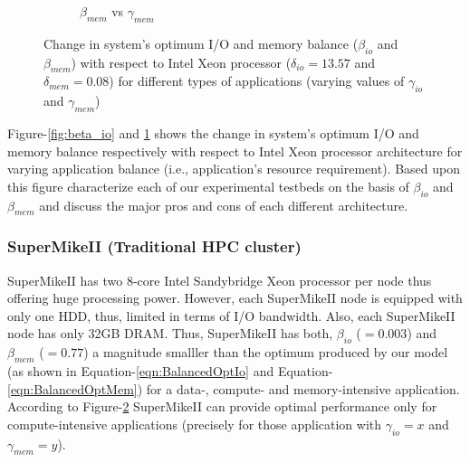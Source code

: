 \documentclass[journal]{IEEEtran}
\begin{document}
\begin{figure}[htb]
\begin{subfigure}[b]{0.23\textwidth}
                \caption{$\beta_{mem}$ vs  $\gamma_{mem}$}
                \label{fig:beta_mem}
   \end{subfigure}
   \caption{Change in system's optimum I/O and memory balance ($\beta_{io}$ and $\beta_{mem}$) with respect to Intel Xeon processor ($\delta_{io} = 13.57$ and $\delta_{mem} = 0.08$) for different types of applications (varying values of $\gamma_{io}$ and $\gamma_{mem}$)}
  \label{fig:BetaVsGamma}
\end{figure}
Figure-\ref{fig:beta_io} and \ref{fig:beta_mem} shows the change in system's optimum I/O and memory balance respectively with respect to Intel Xeon processor architecture for varying application balance (i.e., application's resource requirement). Based upon this figure characterize each of our experimental testbeds on the basis of $\beta_{io}$ and $\beta_{mem}$ and discuss the major pros and cons of each different architecture.  

\subsubsection{SuperMikeII (Traditional HPC cluster)}
SuperMikeII has two 8-core Intel Sandybridge Xeon processor per node thus oﬀering huge processing power. However, each SuperMikeII node is equipped with only one HDD, thus, limited in terms of I/O bandwidth. Also, each SuperMikeII node has only 32GB DRAM. Thus, SuperMikeII has both, $\beta_{io}$ ($=0.003$) and $\beta_{mem}$ ($=0.77$) a magnitude smalller than the optimum produced by our model (as shown in Equation-\ref{eqn:BalancedOptIo} and Equation-\ref{eqn:BalancedOptMem}) for a data-, compute- and memory-intensive application. According to Figure-\ref{fig:BetaVsGamma} SuperMikeII can provide optimal performance only for compute-intensive applications (precisely for those application with $\gamma_{io}=x$ and $\gamma_{mem}=y$).  
\end{document}
